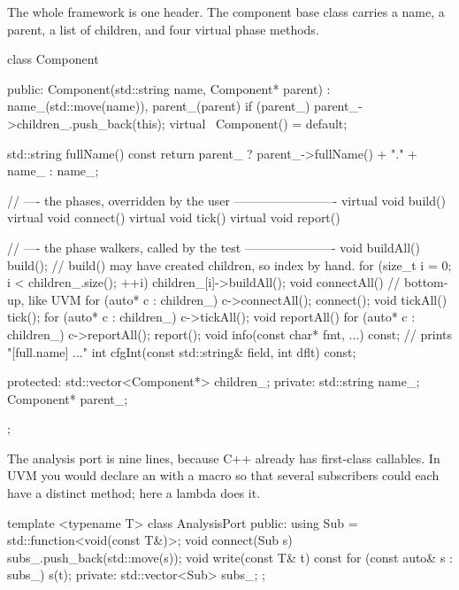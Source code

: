 The whole framework is one header. The component base
class carries a name, a parent, a list of children, and four virtual phase
methods.

\begin{cppcode}[caption={\file{svtlm.h}: the component base class},label={lst:verilator:comp}]
class Component {
  public:
    Component(std::string name, Component* parent)
        : name_(std::move(name)), parent_(parent) {
        if (parent_) parent_->children_.push_back(this);
    }
    virtual ~Component() = default;

    std::string fullName() const {
        return parent_ ? parent_->fullName() + "." + name_ : name_;
    }

    // ---- the phases, overridden by the user -------------------------
    virtual void build()   {}
    virtual void connect() {}
    virtual void tick()    {}
    virtual void report()  {}

    // ---- the phase walkers, called by the test ----------------------
    void buildAll() {
        build();
        // build() may have created children, so index by hand.
        for (size_t i = 0; i < children_.size(); ++i) children_[i]->buildAll();
    }
    void connectAll() {                    // bottom-up, like UVM
        for (auto* c : children_) c->connectAll();
        connect();
    }
    void tickAll() {
        tick();
        for (auto* c : children_) c->tickAll();
    }
    void reportAll() {
        for (auto* c : children_) c->reportAll();
        report();
    }
    void info(const char* fmt, ...) const;   // prints "[full.name] ..."
    int  cfgInt(const std::string& field, int dflt) const;

  protected:
    std::vector<Component*> children_;
  private:
    std::string name_;
    Component*  parent_;
};
\end{cppcode}

The analysis port is nine lines, because C++ already has first-class callables.
In UVM you would declare an  with a macro so that
several subscribers could each have a distinct  method; here a
lambda does it.

\begin{cppcode}[caption={The TLM analysis port},label={lst:verilator:ap}]
template <typename T>
class AnalysisPort {
  public:
    using Sub = std::function<void(const T&)>;
    void connect(Sub s) { subs_.push_back(std::move(s)); }
    void write(const T& t) const { for (const auto& s : subs_) s(t); }
  private:
    std::vector<Sub> subs_;
};
\end{cppcode}

